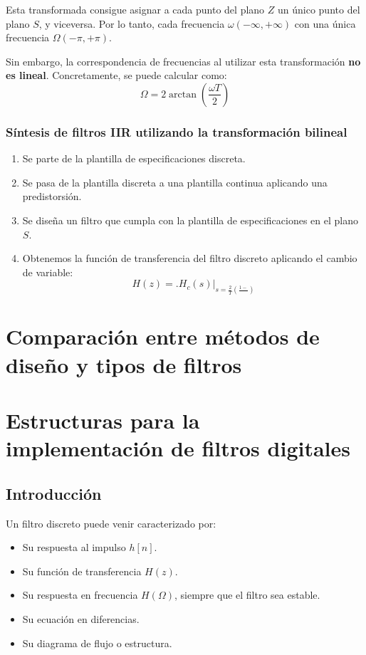 \documentclass[a4paper,oneside]{book}
\begin{document}
Esta transformada consigue asignar a cada punto del plano $Z$ un único punto del plano $S$, y viceversa. Por lo tanto, cada frecuencia $\omega \left( -\infty , +\infty \right)$ con una única frecuencia $\Omega \left( -\pi , +\pi \right)$.

Sin embargo, la correspondencia de frecuencias al utilizar esta transformación \textbf{no es lineal}. Concretamente, se puede calcular como:
\[ \Omega = 2 \arctan \left( \frac{\omega T}{2} \right) \]

\subsubsection{Síntesis de filtros IIR utilizando la transformación bilineal}

\begin{enumerate}
	 \item Se parte de la plantilla de especificaciones discreta.
	 \item Se pasa de la plantilla discreta a una plantilla continua aplicando una predistorsión.
	 \item Se diseña un filtro que cumpla con la plantilla de especificaciones en el plano $S$.
	 \item Obtenemos la función de transferencia del filtro discreto aplicando el cambio de variable: \[ H(z) = \biggl. H_c(s) \biggr\vert _{s = \frac{2}{T} \left( \frac{1 -}{} \right)}^{} \]
\end{enumerate}

\section{Comparación entre métodos de diseño y tipos de filtros}

\section{Estructuras para la implementación de filtros digitales}

\subsection{Introducción}

Un filtro discreto puede venir caracterizado por:
\begin{itemize}
	\item Su respuesta al impulso $h[n]$.
	\item Su función de transferencia $H(z)$.
	\item Su respuesta en frecuencia $H(\Omega )$, siempre que el filtro sea estable.
	\item Su ecuación en diferencias.
	\item Su diagrama de flujo o estructura.
\end{itemize}
\end{document}
